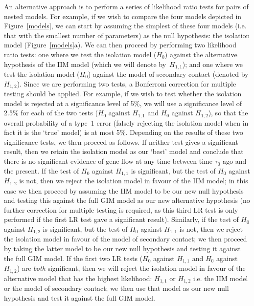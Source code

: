 \documentclass[11pt]{article}
\begin{document}
An alternative approach is to perform a series of likelihood ratio tests for pairs of nested models. For example, if we wish to compare the four models depicted in Figure~\ref{models}, we can start by assuming the simplest of these four models (i.e. that with the smallest number of parameters) as the null hypothesis: the isolation model (Figure~\ref{models}a). We can then proceed by performing two likelihood ratio tests: one where we test the isolation model ($H_0$) against the alternative hypothesis of the IIM model %
(which we will denote by~$H_{1,1}$);
and one
where we test the isolation model ($H_0$) against the model of secondary contact 
(denoted by $H_{1,2}$). Since we are performing two tests, a Bonferroni correction for multiple testing 
should be applied.
For example, if we wish to test whether the isolation model is rejected at a significance level of 5\%, we will use a significance level of 2.5\% for each of the two tests ($H_0$ against $H_{1,1}$ and $H_0$ against $H_{1,2}$), so that the overall probability of a type~1 error (falsely rejecting the isolation model when in fact it is the `true' model) is at most 5\%. Depending on the results of these two significance tests, we then proceed as follows. If neither test gives a significant result, then we retain the isolation model as our `best' model and conclude that there is no significant evidence of gene flow at any time between time $\tau_0$ ago and the present. If the test of $H_0$ against $H_{1,1}$ is significant, but the test of $H_0$ against $H_{1,2}$ is not, then we reject the isolation model in favour of the IIM model; in this case we then proceed by assuming the IIM model to be our new null hypothesis and testing this against the full GIM model as our new alternative hypothesis (no further correction for multiple testing is required, as this third LR test is only performed if the first LR test gave a significant result). Similarly, if the test of $H_0$ against $H_{1,2}$ is significant, but the test of $H_0$ against $H_{1,1}$ is not, then we reject the isolation model in favour of the model of secondary contact; we then proceed by taking the latter model to be our new null hypothesis and testing it against the full GIM model.
If the first two LR tests ($H_0$ against $H_{1,1}$ and $H_0$ against $H_{1,2}$) are {\em both} significant, then we will reject the isolation model in favour of the alternative model that
has the highest likelihood: $H_{1,1}$ or $H_{1,2}$ i.e. the IIM model or the model of secondary contact; we then use that model as our new null hypothesis and test it against the full GIM model. 
\end{document}

